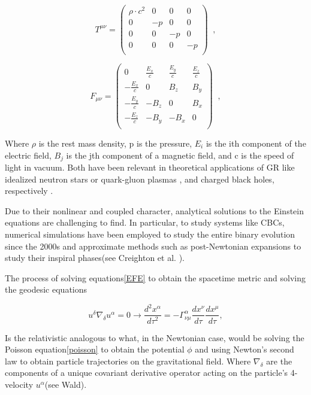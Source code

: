 \begin{equation}\label{PF}
T^{\mu \nu} = 
\begin{pmatrix}
\rho \cdot c^2&0&0&0 \\
0&-p&0&0 \\
0&0&-p&0 \\
0&0&0&-p\\
\end{pmatrix} \;\; ,
\end{equation}

\begin{equation}
F_{\mu \nu} = 
\begin{pmatrix}
0&\frac{E_x}{c}&\frac{E_y}{c}&\frac{E_z}{c} \\
-\frac{E_x}{c} &0   &B_z  &B_y \\
-\frac{E_y}{c} &-B_z&0    &B_x \\
-\frac{E_z}{c} &-B_y&-B_x &0\\
\end{pmatrix} \;\;,
\end{equation}


Where $\rho$ is the rest mass density, p is the pressure, $E_i$ is the ith component of the electric field, $B_j$ is the jth component of a magnetic field, and c is the speed of light in vacuum. Both have been relevant in theoretical applications of GR like idealized neutron stars or quark-gluon plasmas \cite{Nagle_2011}, and charged black holes, respectively \cite{PhysRevD.13.2713}.

Due to their nonlinear and coupled character, analytical solutions to the Einstein equations are challenging to find. In particular, to study systems like CBCs, numerical simulations have been employed to study the entire binary evolution since the 2000s \cite{Shibata:1999hn,Shibata:1999wm,Shibata:2019wef} and approximate methods such as post-Newtonian expansions to study their inspiral phases(see Creighton et al. \cite{Creighton:2011zz}). 

The process of solving equations\ref{EFE} to obtain the spacetime metric and solving the geodesic equations 

\begin{equation}\label{par-trans}
u^{\delta} \nabla_{\delta } u^{\alpha } = 
0 \rightarrow \frac{d^2 x^{\alpha}}{d\tau^2} = - \Gamma^{\alpha}_{\nu\mu} \frac{dx^{\nu}}{d\tau} \frac{dx^{\mu}}{d\tau},
\end{equation}

Is the relativistic analogous to what, in the Newtonian case, would be solving the Poisson equation\ref{poisson} to obtain the potential $\phi$ and using Newton's second law to obtain particle trajectories on the gravitational field. Where  $\nabla_{\delta}$ are the components of a unique covariant derivative operator acting on the particle's 4-velocity $u^{\alpha}$(see Wald\cite{Wald:1984rg}). 

